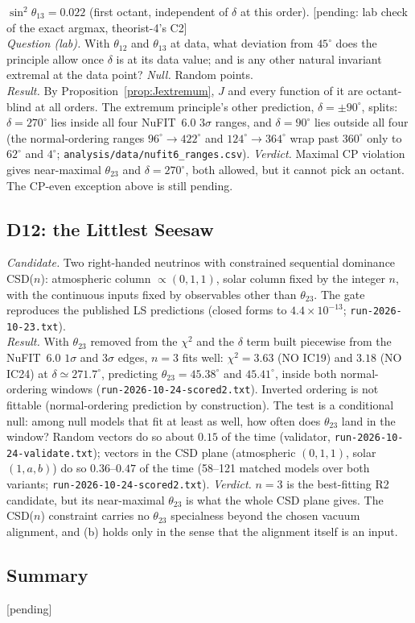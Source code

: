 $\sin^2\theta_{13}=0.022$ (first octant, independent of $\delta$ at this order). [pending: lab check
of the exact argmax, theorist-4's C2]\\
\emph{Question (lab).} With $\theta_{12}$ and $\theta_{13}$ at data, what deviation from $45^\circ$
does the principle allow once $\delta$ is at its data value; and is any other natural invariant
extremal at the data point? \emph{Null.} Random points.\\
\emph{Result.} By Proposition~\ref{prop:Jextremum}, $J$ and every function of it are octant-blind at
all orders. The extremum principle's other prediction, $\delta=\pm90^\circ$, splits: $\delta=270^\circ$
lies inside all four NuFIT~6.0 $3\sigma$ ranges, and $\delta=90^\circ$ lies outside all four
(the normal-ordering ranges $96^\circ\to422^\circ$ and $124^\circ\to364^\circ$ wrap past $360^\circ$
only to $62^\circ$ and $4^\circ$; \texttt{analysis/data/nufit6\_ranges.csv}).\quad
\emph{Verdict.} Maximal CP violation gives near-maximal $\theta_{23}$ and $\delta=270^\circ$, both
allowed, but it cannot pick an octant. The CP-even exception above is still pending.

\subsection{D12: the Littlest Seesaw}\label{sec:D12}
\emph{Candidate.} Two right-handed neutrinos with constrained sequential dominance CSD($n$):
atmospheric column $\propto(0,1,1)$, solar column fixed by the integer $n$, with the continuous inputs fixed
by observables other than $\theta_{23}$. The gate reproduces the published LS predictions
(closed forms to $4.4\times10^{-13}$; \texttt{run-2026-10-23.txt}).\\
\emph{Result.} With $\theta_{23}$ removed from the $\chi^2$ and the $\delta$ term built piecewise from
the NuFIT~6.0 $1\sigma$ and $3\sigma$ edges, $n=3$ fits well: $\chi^2=3.63$ (NO IC19) and $3.18$
(NO IC24) at $\delta\simeq271.7^\circ$, predicting $\theta_{23}=45.38^\circ$ and $45.41^\circ$, inside both
normal-ordering windows (\texttt{run-2026-10-24-scored2.txt}). Inverted ordering is not fittable
(normal-ordering prediction by construction). The test is a conditional null: among null models that
fit at least as well, how often does $\theta_{23}$ land in the window? Random vectors do so about
$0.15$ of the time (validator, \texttt{run-2026-10-24-validate.txt}); vectors in the CSD plane
(atmospheric $(0,1,1)$, solar $(1,a,b)$) do so $0.36$--$0.47$ of the time (58--121 matched models over both
variants; \texttt{run-2026-10-24-scored2.txt}).\quad
\emph{Verdict.} $n=3$ is the best-fitting R2 candidate, but its near-maximal $\theta_{23}$ is what
the whole CSD plane gives. The CSD($n$) constraint carries no $\theta_{23}$ specialness beyond the
chosen vacuum alignment, and (b) holds only in the sense that the alignment itself is an input.


\subsection{Summary}\label{sec:r2-summary}
[pending]
